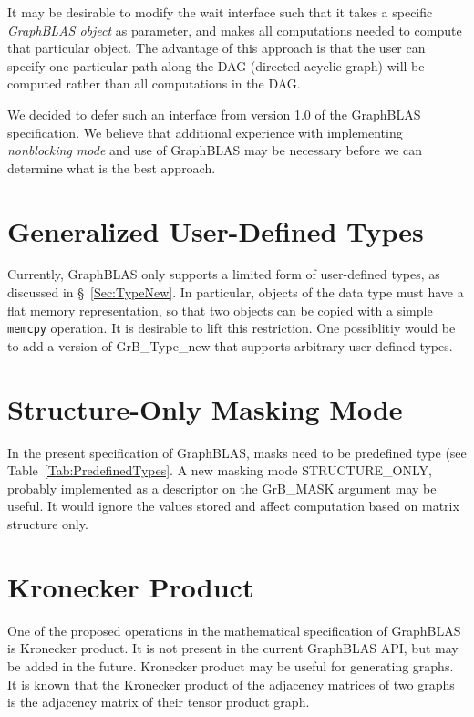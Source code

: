 It may be desirable to modify the {\sf wait} interface such that it takes a specific \emph{GraphBLAS object} as parameter, and makes all computations needed to compute that particular object. The advantage of this approach is that the user can specify one particular path along the DAG (directed acyclic graph) will be computed rather than all computations in the DAG.

We decided to defer such an interface from version 1.0 of the GraphBLAS specification. We believe that additional experience with implementing \emph{nonblocking mode} and use of GraphBLAS may be necessary before we can determine what is the best approach.


\section{Generalized User-Defined Types}

Currently, GraphBLAS only supports a limited form of user-defined types, as discussed in \S~\ref{Sec:TypeNew}. In particular, objects of the
data type must have a flat memory representation, so that two objects can be copied with a simple {\tt memcpy} operation. 
It is desirable to lift this restriction. One possiblitiy would be to add a version of {\sf GrB\_Type\_new} that supports
arbitrary user-defined types.

\section{Structure-Only Masking Mode}

 In the present specification of GraphBLAS, masks need to be predefined type (see Table~\ref{Tab:PredefinedTypes}. A new masking mode {\sf STRUCTURE\_ONLY}, probably implemented as a descriptor on the {\sf GrB\_MASK} argument may be useful. It would ignore the values stored and affect computation based on matrix structure only.
 
 \section{Kronecker Product}

One of the proposed operations in the mathematical specification of GraphBLAS is Kronecker product. It is not present in the current GraphBLAS API, but may be added in the future. Kronecker product may be useful for generating graphs. It is known that the Kronecker product of the adjacency matrices of two graphs is the adjacency matrix of their tensor product graph.

